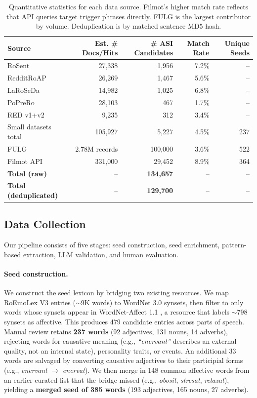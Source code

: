 \documentclass[11pt]{article}
\begin{document}
\begin{table}[htbp]
    \centering
    \begin{tabular}{lrrrr}
        \toprule
        Source & Est. \# Docs/Hits & \# ASI Candidates & Match Rate & Unique Seeds \\
        \midrule
        RoSent & 27,338 & 1,956 & 7.2\% & -- \\
        RedditRoAP & 26,269 & 1,467 & 5.6\% & -- \\
        LaRoSeDa & 14,982 & 1,025 & 6.8\% & -- \\
        PoPreRo & 28,103 & 467 & 1.7\% & -- \\
        RED v1+v2 & 9,235 & 312 & 3.4\% & -- \\
        \midrule
        Small datasets total & 105,927 & 5,227 & 4.5\% & 237 \\
        FULG & 2.78M records & 100,000 & 3.6\% & 522 \\
        Filmot API & 331,000 & 29,452 & 8.9\% & 364 \\
        \midrule
        \textbf{Total (raw)} & -- & \textbf{134,657} & -- & -- \\
        \textbf{Total (deduplicated)} & -- & \textbf{129,700} & -- & -- \\
        \bottomrule
    \end{tabular}
    \caption{Quantitative statistics for each data source. Filmot's higher match rate reflects that API queries target trigger phrases directly. FULG is the largest contributor by volume. Deduplication is by matched sentence MD5 hash.}
    \label{tab:quant-data}
\end{table}


\subsection{Data Collection}

Our pipeline consists of five stages: seed construction, seed enrichment, pattern-based extraction, LLM validation, and human evaluation.

\paragraph{Seed construction.} We construct the seed lexicon by bridging two existing resources. We map RoEmoLex V3 entries ($\sim$9K words) to WordNet 3.0 synsets, then filter to only words whose synsets appear in WordNet-Affect 1.1 \cite{strapparava2004}, a resource that labels $\sim$798 synsets as affective. This produces 479 candidate entries across parts of speech. Manual review retains \textbf{237 words} (92 adjectives, 131 nouns, 14 adverbs), rejecting words for causative meaning (e.g., \textit{``enervant''} describes an external quality, not an internal state), personality traits, or events. An additional 33 words are salvaged by converting causative adjectives to their participial forms (e.g., \textit{enervant} $\rightarrow$ \textit{enervat}). We then merge in 148 common affective words from an earlier curated list that the bridge missed (e.g., \textit{obosit}, \textit{stresat}, \textit{relaxat}), yielding a \textbf{merged seed of 385 words} (193 adjectives, 165 nouns, 27 adverbs).
\end{document}
